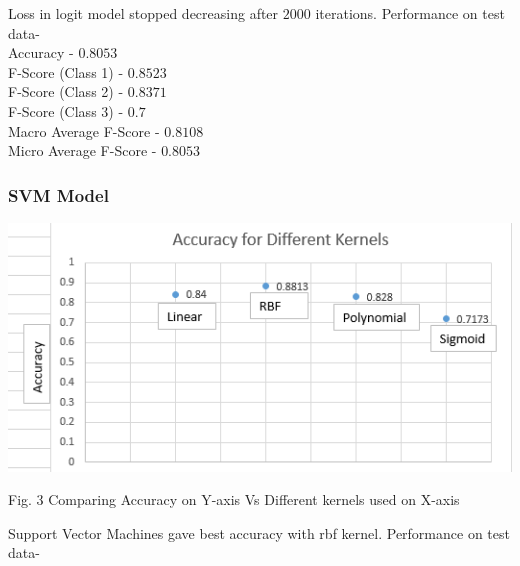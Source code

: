 \documentclass[12pt,journal,compsoc]{IEEEtran}
\begin{document}
Loss in logit model stopped decreasing after $2000$ iterations.
Performance on test data-\\ 
Accuracy - $0.8053$\\ F-Score (Class 1) - $0.8523$\\
F-Score (Class 2) - $0.8371$\\ F-Score (Class 3) - $0.7$\\ Macro Average F-Score - $0.8108$\\
Micro Average F-Score - $0.8053$\\

\subsubsection{SVM Model}
\begin{center}
\includegraphics[scale=0.6]{svm_medical.png}

{\small Fig. 3 Comparing Accuracy on Y-axis Vs Different kernels used on X-axis}
\end{center}

Support Vector Machines gave best accuracy with rbf kernel.
Performance on test data-\\ 
\\
\end{document}
